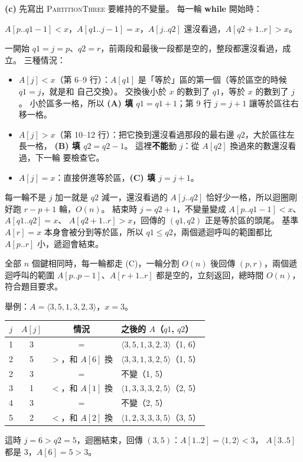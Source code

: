 \begin{pastsoln}
\textbf{(c)} 先寫出 \textsc{PartitionThree} 要維持的不變量。 每一輪 \textbf{while} 開始時：
\begin{center}
$A[p..q1-1] < x$，\quad $A[q1..j-1] = x$，\quad $A[j..q2]$ 還沒看過，\quad $A[q2+1..r] > x$。
\end{center}
一開始 $q1 = j = p$、$q2 = r$，前兩段和最後一段都是空的，整段都還沒看過，成立。 三種情況：
\begin{itemize}
\item $A[j] < x$（第 6--9 行）：$A[q1]$ 是「等於」區的第一個（等於區空的時候 $q1 = j$，就是和
自己交換）。 交換後小於 $x$ 的數到了 $q1$，等於 $x$ 的數到了 $j$。 小於區多一格，所以
\textbf{(A) 填 $q1 = q1 + 1$}；第 9 行 $j = j + 1$ 讓等於區往右移一格。
\item $A[j] > x$（第 10--12 行）：把它換到還沒看過那段的最右邊 $q2$，大於區往左長一格，
\textbf{(B) 填 $q2 = q2 - 1$}。 這裡\textbf{不能}動 $j$：從 $A[q2]$ 換過來的數還沒看過，下一輪
要檢查它。
\item $A[j] = x$：直接併進等於區，\textbf{(C) 填 $j = j + 1$}。
\end{itemize}
每一輪不是 $j$ 加一就是 $q2$ 減一，還沒看過的 $A[j..q2]$ 恰好少一格，所以迴圈剛好跑
$r - p + 1$ 輪，$O(n)$。 結束時 $j = q2 + 1$，不變量變成 $A[p..q1-1] < x$、$A[q1..q2] = x$、
$A[q2+1..r] > x$，回傳的 $(q1, q2)$ 正是等於區的頭尾。 基準 $A[r] = x$ 本身會被分到等於區，所以
$q1 \le q2$，兩個遞迴呼叫的範圍都比 $A[p..r]$ 小，遞迴會結束。

全部 $n$ 個鍵相同時，每一輪都走 (C)，一輪分割 $O(n)$ 後回傳 $(p, r)$，兩個遞迴呼叫的範圍
$A[p..p-1]$、$A[r+1..r]$ 都是空的，立刻返回，總時間 $O(n)$，符合題目要求。

舉例：$A = \langle 3, 5, 1, 3, 2, 3\rangle$，$x = 3$。
\begin{center}
\small
\begin{tabular}{cccl}
\toprule
$j$ & $A[j]$ & 情況 & 之後的 $A$（$q1$, $q2$）\\
\midrule
1 & 3 & $=$ & $\langle 3, 5, 1, 3, 2, 3\rangle$（1, 6） \\
2 & 5 & $>$，和 $A[6]$ 換 & $\langle 3, 3, 1, 3, 2, 5\rangle$（1, 5） \\
2 & 3 & $=$ & 不變（1, 5） \\
3 & 1 & $<$，和 $A[1]$ 換 & $\langle 1, 3, 3, 3, 2, 5\rangle$（2, 5） \\
4 & 3 & $=$ & 不變（2, 5） \\
5 & 2 & $<$，和 $A[2]$ 換 & $\langle 1, 2, 3, 3, 3, 5\rangle$（3, 5） \\
\bottomrule
\end{tabular}
\end{center}
這時 $j = 6 > q2 = 5$，迴圈結束，回傳 $(3, 5)$：$A[1..2] = \langle 1, 2\rangle < 3$，
$A[3..5]$ 都是 $3$，$A[6] = 5 > 3$。
\end{pastsoln}
